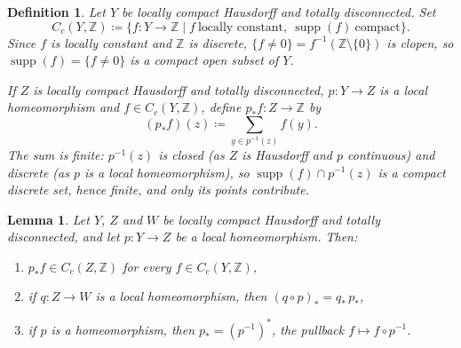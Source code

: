 \documentclass[10pt,a4paper]{amsart}
\newtheorem{defi}{Definition}
\newtheorem{lem}{Lemma}
\newcommand{\Z}{\mathbb{Z}}
\DeclareMathOperator{\supp}{supp}
\begin{document}
\begin{defi}\label{def:Cc}
Let \(Y\) be locally compact Hausdorff and totally disconnected.
Set
\begin{equation}\label{eq:Cc}
C_c(Y,\Z)\coloneqq\{f\colon Y\to\Z\mid f\ \text{locally constant},\ \supp(f)\ \text{compact}\}.
\end{equation}
Since \(f\) is locally constant and \(\Z\) is discrete, \(\{f\neq0\}=f^{-1}(\Z\setminus\{0\})\) is clopen, so \(\supp(f)=\{f\neq0\}\) is a \emph{compact open} subset of \(Y\).

If \(Z\) is locally compact Hausdorff and totally disconnected, \(p\colon Y\to Z\) is a local homeomorphism and \(f\in C_c(Y,\Z)\), define \(p_*f\colon Z\to\Z\) by
\begin{equation}\label{eq:pushforward}
(p_*f)(z)\coloneqq\sum_{y\in p^{-1}(z)}f(y).
\end{equation}
The sum is finite: \(p^{-1}(z)\) is closed (as \(Z\) is Hausdorff and \(p\) continuous) and discrete (as \(p\) is a local homeomorphism), so \(\supp(f)\cap p^{-1}(z)\) is a compact discrete set, hence finite, and only its points contribute.
\end{defi}

\begin{lem}\label{lem:pushforward}
Let \(Y\), \(Z\) and \(W\) be locally compact Hausdorff and totally disconnected, and let \(p\colon Y\to Z\) be a local homeomorphism. Then:
\begin{enumerate}
\item\label{it:push-cc} \(p_*f\in C_c(Z,\Z)\) for every \(f\in C_c(Y,\Z)\),
\item\label{it:push-funct} if \(q\colon Z\to W\) is a local homeomorphism, then \((q\circ p)_*=q_*\,p_*\),
\item\label{it:push-homeo} if \(p\) is a homeomorphism, then \(p_*=(p^{-1})^*\), the pullback \(f\mapsto f\circ p^{-1}\).
\end{enumerate}
\end{lem}
\end{document}
